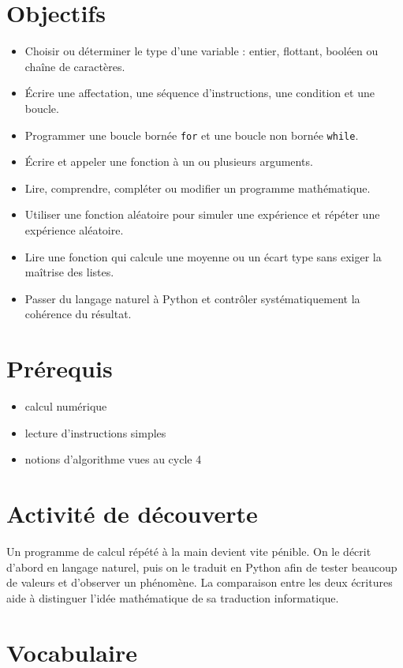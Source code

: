 \section{Objectifs}

\begin{itemize}
\item Choisir ou déterminer le type d'une variable : entier, flottant, booléen ou chaîne de caractères.
\item Écrire une affectation, une séquence d'instructions, une condition et une boucle.
\item Programmer une boucle bornée \texttt{for} et une boucle non bornée \texttt{while}.
\item Écrire et appeler une fonction à un ou plusieurs arguments.
\item Lire, comprendre, compléter ou modifier un programme mathématique.
\item Utiliser une fonction aléatoire pour simuler une expérience et répéter une expérience aléatoire.
\item Lire une fonction qui calcule une moyenne ou un écart type sans exiger la maîtrise des listes.
\item Passer du langage naturel à Python et contrôler systématiquement la cohérence du résultat.
\end{itemize}

\section{Prérequis}

\begin{itemize}
\item calcul numérique
\item lecture d'instructions simples
\item notions d'algorithme vues au cycle 4
\end{itemize}

\section{Activité de découverte}

Un programme de calcul répété à la main devient vite pénible. On le décrit d'abord en langage naturel, puis on le traduit en Python afin de tester beaucoup de valeurs et d'observer un phénomène. La comparaison entre les deux écritures aide à distinguer l'idée mathématique de sa traduction informatique.

\section{Vocabulaire}

